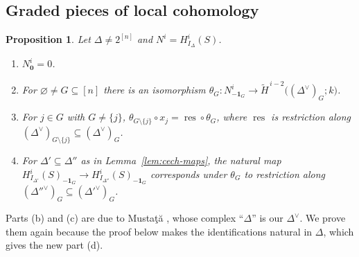 \documentclass[11pt]{article}
\theoremstyle{plain}
\newtheorem{proposition}[theorem]{Proposition}
\theoremstyle{definition}
\newcommand{\kk}{k}
\newcommand{\rH}{\widetilde{H}}
\newcommand{\Hloc}[2]{H^{#1}_{#2}}
\newcommand{\one}{\mathbf 1}
\newcommand{\res}{\operatorname{res}}
\begin{document}
\subsection{Graded pieces of local cohomology}

\begin{proposition}\label{prop:graded-pieces}
Let $\Delta\neq2^{[n]}$ and $N^i=\Hloc{i}{I_\Delta}(S)$.
\begin{enumerate}[label=\textup{(\alph*)},nosep]
\item $N^i_{\mathbf 0}=0$.
\item For $\varnothing\neq G\subseteq[n]$ there is an isomorphism
$\theta_G\colon N^i_{-\one_G}\to\rH^{\,i-2}\bigl((\Delta^\vee)_G;\kk\bigr)$.
\item For $j\in G$ with $G\ne\{j\}$, $\theta_{G\setminus\{j\}}\circ x_j=\res\circ\theta_G$, where $\res$ is
restriction along $(\Delta^\vee)_{G\setminus\{j\}}\subseteq(\Delta^\vee)_G$.
\item For $\Delta'\subseteq\Delta''$ as in Lemma~\ref{lem:cech-maps}, the natural map
$\Hloc{i}{I_{\Delta'}}(S)_{-\one_G}\to\Hloc{i}{I_{\Delta''}}(S)_{-\one_G}$ corresponds under $\theta_G$ to restriction
along $(\Delta''^\vee)_G\subseteq(\Delta'^\vee)_G$.
\end{enumerate}
\end{proposition}

Parts (b) and (c) are due to Musta\c{t}\u{a} \cite[Cor.~2.2(a),(b)]{Mustata}, whose
complex ``$\Delta$'' is our $\Delta^\vee$. We prove them again because the proof below
makes the identifications natural in $\Delta$, which gives the new part (d).
\end{document}
